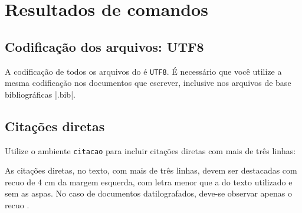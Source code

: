 
 
\chapter{Resultados de comandos}\label{cap_exemplos}


\section{Codificação dos arquivos: UTF8}

A codificação de todos os arquivos do  é \texttt{UTF8}. É necessário que
você utilize a mesma codificação nos documentos que escrever, inclusive nos
arquivos de base bibliográficas |.bib|.

\section{Citações diretas}
\label{sec-citacao}

Utilize o ambiente \texttt{citacao} para incluir
citações diretas com mais de três linhas:

\begin{citacao}
As citações diretas, no texto, com mais de três linhas, devem ser
destacadas com recuo de 4 cm da margem esquerda, com letra menor que a do texto
utilizado e sem as aspas. No caso de documentos datilografados, deve-se
observar apenas o recuo \cite[5.3]{NBR10520:2002}.
\end{citacao}

